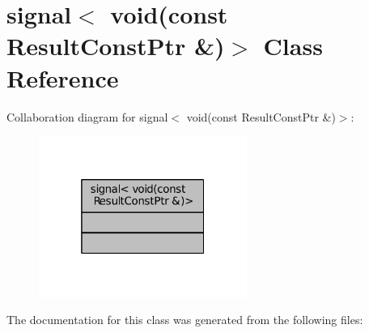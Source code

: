 \hypertarget{classsignal_3_01void_07const_01ResultConstPtr_01_6_08_4}{}\section{signal$<$ void(const Result\+Const\+Ptr \&)$>$ Class Reference}
\label{classsignal_3_01void_07const_01ResultConstPtr_01_6_08_4}


Collaboration diagram for signal$<$ void(const Result\+Const\+Ptr \&)$>$\+:
\nopagebreak
\begin{figure}[H]
\begin{center}
\leavevmode
\includegraphics[width=193pt]{classsignal_3_01void_07const_01ResultConstPtr_01_6_08_4__coll__graph}
\end{center}
\end{figure}


The documentation for this class was generated from the following files\+: